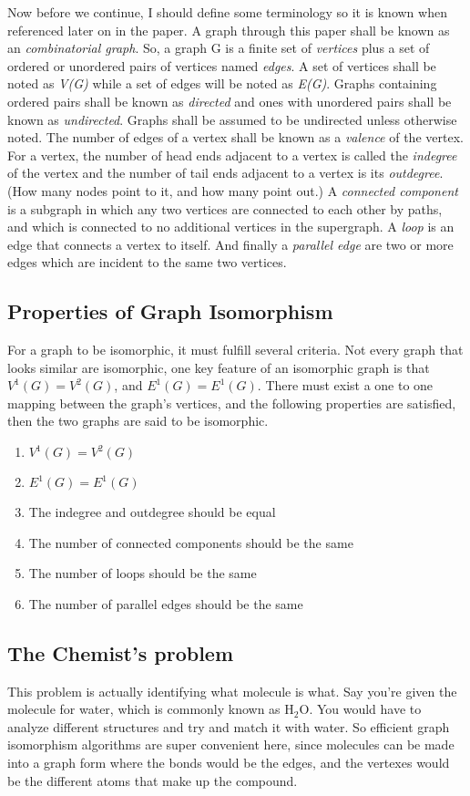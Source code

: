 \documentclass[notitlepage]{report}
\begin{document}
Now before we continue, I should define some terminology so it is known when referenced later on in the paper. A graph through this paper shall be known as an \textit{combinatorial graph}. So, a graph G is a finite set of \textit{vertices} plus a set of ordered or unordered pairs of vertices named \textit{edges}. A set of vertices shall be noted as \textit{V(G)} while a set of edges will be noted as \textit{E(G)}. Graphs containing ordered pairs shall be known as \textit{directed} and ones with unordered pairs shall be known as \textit{undirected}. Graphs shall be assumed to be undirected unless otherwise noted. The number of edges of a vertex shall be known as a \textit{valence} of the vertex. For a vertex, the number of head ends adjacent to a vertex is called the \textit{indegree} of the vertex and the number of tail ends adjacent to a vertex is its \textit{outdegree}. (How many nodes point to it, and how many point out.) A \textit{connected component} is a subgraph in which any two vertices are connected to each other by paths, and which is connected to no additional vertices in the supergraph. A \textit{loop} is an edge that connects a vertex to itself. And finally a \textit{parallel edge} are two or more edges which are incident to the same two vertices.

\subsection*{Properties of Graph Isomorphism}
For a graph to be isomorphic, it must fulfill several criteria. Not every graph that looks similar are isomorphic, one key feature of an isomorphic graph is that $V^{1}(G) = V^{2}(G)$, and $E^{1}(G) = E^{1}(G)$. There must exist a one to one mapping between the graph's vertices, and the following properties are satisfied, then the two graphs are said to be isomorphic.

\begin{enumerate}
\item $V^{1}(G) = V^{2}(G)$
\item $E^{1}(G) = E^{1}(G)$
\item The indegree and outdegree should be equal
\item The number of connected components should be the same
\item The number of loops should be the same
\item The number of parallel edges should be the same
\end{enumerate}

\subsection*{The Chemist's problem}
This problem is actually identifying what molecule is what. Say you're given the molecule for water, which is commonly known as H$_{2}$O. You would have to analyze different structures and try and match it with water. So efficient graph isomorphism algorithms are super convenient here, since molecules can be made into a graph form where the bonds would be the edges, and the vertexes would be the different atoms that make up the compound.~\cite{miller}
\end{document}
